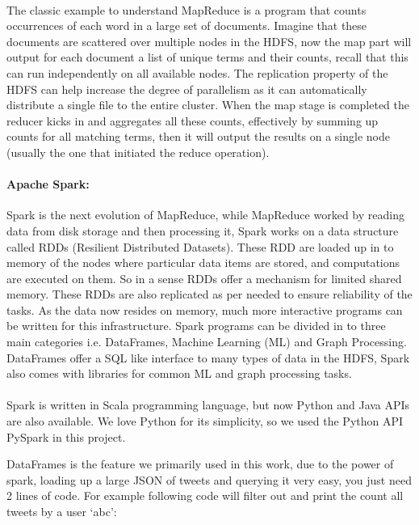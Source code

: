 \documentclass[12pt]{report}
\theoremstyle{named}
\begin{document}
\paragraph{}The classic example to understand MapReduce is a program that counts occurrences of each word in a large set of documents. Imagine that these documents are scattered over multiple nodes in the HDFS, now the map part will output for each document a list of unique terms and their counts, recall that this can run independently on all available nodes. The replication property of the HDFS can help increase the degree of parallelism as it can automatically distribute a single file to the entire cluster. When the map stage is completed the reducer kicks in and aggregates all these counts, effectively by summing up counts for all matching terms, then it will output the results on a single node (usually the one that initiated the reduce operation).

\paragraph{Apache Spark:\\}
Spark is the next evolution of MapReduce, while MapReduce worked by reading data from disk storage and then processing it, Spark works on a data structure called RDDs (Resilient Distributed Datasets). These RDD are loaded up in to memory of the nodes where particular data items are stored, and computations are executed on them. So in a sense RDDs offer a mechanism for limited shared memory. These RDDs are also replicated as per needed to ensure reliability of the tasks. As the data now resides on memory, much more interactive programs can be written for this infrastructure. Spark programs can be divided in to three main categories i.e. DataFrames, Machine Learning (ML) and Graph Processing. DataFrames offer a SQL like interface to many types of data in the HDFS, Spark also comes with libraries for common ML and graph processing tasks.

\paragraph{}
Spark is written in Scala programming language, but now Python and Java APIs are also available. We love Python for its simplicity, so we used the Python API PySpark in this project.

DataFrames is the feature we primarily used in this work, due to the power of spark, loading up a large JSON of tweets and querying it very easy, you just need 2 lines of code. For example following code will filter out and print the count all tweets by a user `abc':
\end{document}
